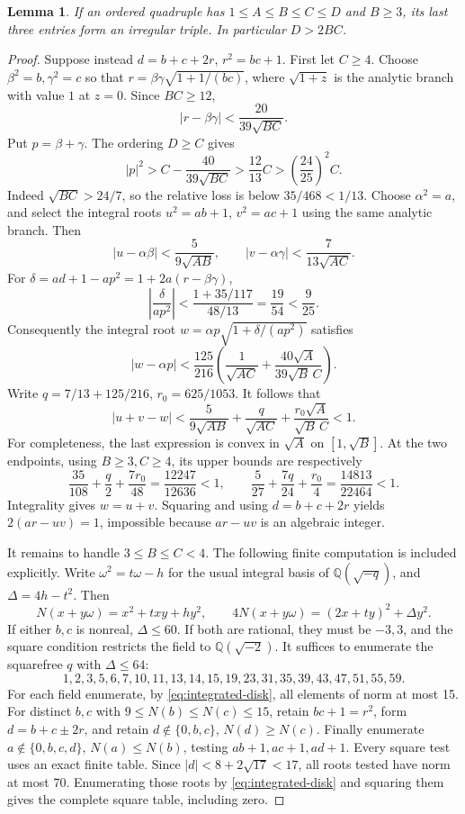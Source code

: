 \documentclass[12pt]{article}
\newtheorem{lemma}[theorem]{Lemma}
\numberwithin{equation}{section}
\begin{document}
\begin{lemma}\label{lem:tail-irregular}
If an ordered quadruple has \(1\le A\le B\le C\le D\) and \(B\ge3\),
its last three entries form an irregular triple. In particular \(D>2BC\).
\end{lemma}
\begin{proof}
Suppose instead \(d=b+c+2r\), \(r^2=bc+1\). First let \(C\ge4\).
Choose \(\beta^2=b,\gamma^2=c\) so that
\(r=\beta\gamma\sqrt{1+1/(bc)}\), where \(\sqrt{1+z}\) is the
analytic branch with value \(1\) at \(z=0\).
Since \(BC\ge12\),
\[
 |r-\beta\gamma|<\frac{20}{39\sqrt{BC}}.
\]
Put \(p=\beta+\gamma\). The ordering \(D\ge C\) gives
\[
 |p|^2>C-\frac{40}{39\sqrt{BC}}>
 \frac{12}{13}C>\left(\frac{24}{25}\right)^2C.
\]
Indeed \(\sqrt{BC}>24/7\), so the relative loss is below
\(35/468<1/13\).
Choose \(\alpha^2=a\), and select the integral roots \(u^2=ab+1\),
\(v^2=ac+1\) using the same analytic branch. Then
\[
 |u-\alpha\beta|<\frac5{9\sqrt{AB}},\qquad
 |v-\alpha\gamma|<\frac7{13\sqrt{AC}}.
\]
For \(\delta=ad+1-ap^2=1+2a(r-\beta\gamma)\),
\[
 \left|\frac{\delta}{ap^2}\right|
 <\frac{1+35/117}{48/13}=\frac{19}{54}<\frac9{25}.
\]
Consequently the integral root
\(w=\alpha p\sqrt{1+\delta/(ap^2)}\) satisfies
\[
 |w-\alpha p|<
 \frac{125}{216}\left(\frac1{\sqrt{AC}}
       +\frac{40\sqrt A}{39\sqrt B\,C}\right).
\]
Write \(q=7/13+125/216\), \(r_0=625/1053\). It follows that
\[
 |u+v-w|<
 \frac5{9\sqrt{AB}}+\frac q{\sqrt{AC}}
                    +\frac{r_0\sqrt A}{\sqrt B\,C}<1.
\]
For completeness, the last expression is convex in \(\sqrt A\)
on \([1,\sqrt B]\). At the two endpoints, using \(B\ge3,C\ge4\),
its upper bounds are respectively
\[
 \frac{35}{108}+\frac q2+\frac{7r_0}{48}
   =\frac{12247}{12636}<1,\qquad
 \frac5{27}+\frac{7q}{24}+\frac{r_0}{4}
   =\frac{14813}{22464}<1.
\]
Integrality gives \(w=u+v\). Squaring and using
\(d=b+c+2r\) yields \(2(ar-uv)=1\), impossible because
\(ar-uv\) is an algebraic integer.

It remains to handle \(3\le B\le C<4\). The following finite computation
is included explicitly. Write
\(\omega^2=t\omega-h\) for the usual integral basis of
\(\mathbb Q(\sqrt{-q})\), and \(\Delta=4h-t^2\). Then
\begin{equation}\label{eq:integrated-disk}
N(x+y\omega)=x^2+txy+hy^2,\qquad
 4N(x+y\omega)=(2x+ty)^2+\Delta y^2.
\end{equation}
If either \(b,c\) is nonreal, \(\Delta\le60\). If both are rational,
they must be \(-3,3\), and the square condition restricts the field to
\(\mathbb Q(\sqrt{-2})\). It suffices to enumerate the squarefree \(q\)
with \(\Delta\le64\):
\[
 1,2,3,5,6,7,10,11,13,14,15,19,23,31,35,39,43,47,51,55,59.
\]
For each field enumerate, by \eqref{eq:integrated-disk}, all elements of norm at most 15.
For distinct \(b,c\) with \(9\le N(b)\le N(c)\le15\), retain
\(bc+1=r^2\), form \(d=b+c\pm2r\), and retain
\(d\notin\{0,b,c\}\), \(N(d)\ge N(c)\). Finally enumerate
\(a\notin\{0,b,c,d\}\), \(N(a)\le N(b)\), testing \(ab+1,ac+1,ad+1\).
Every square test uses an exact finite table. Since
\(|d|<8+2\sqrt{17}<17\), all roots tested have norm at most 70. Enumerating those roots by \eqref{eq:integrated-disk} and squaring
them gives the complete square table, including zero.


\end{proof}
\end{document}
